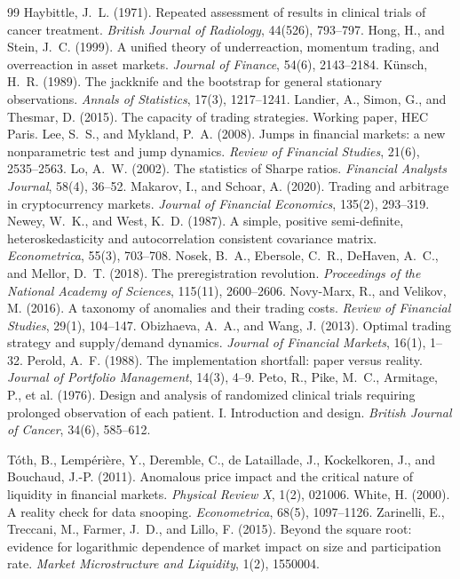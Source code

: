 \documentclass[11pt,a4paper]{article}
\begin{document}
\begin{thebibliography}{99}
 Haybittle, J.~L. (1971). Repeated assessment of results in clinical trials of cancer treatment. \emph{British Journal of Radiology}, 44(526), 793--797.
 Hong, H., and Stein, J.~C. (1999). A unified theory of underreaction, momentum trading, and overreaction in asset markets. \emph{Journal of Finance}, 54(6), 2143--2184.
 K\"unsch, H.~R. (1989). The jackknife and the bootstrap for general stationary observations. \emph{Annals of Statistics}, 17(3), 1217--1241.
 Landier, A., Simon, G., and Thesmar, D. (2015). The capacity of trading strategies. Working paper, HEC Paris.
 Lee, S.~S., and Mykland, P.~A. (2008). Jumps in financial markets: a new nonparametric test and jump dynamics. \emph{Review of Financial Studies}, 21(6), 2535--2563.
 Lo, A.~W. (2002). The statistics of Sharpe ratios. \emph{Financial Analysts Journal}, 58(4), 36--52.
 Makarov, I., and Schoar, A. (2020). Trading and arbitrage in cryptocurrency markets. \emph{Journal of Financial Economics}, 135(2), 293--319.
 Newey, W.~K., and West, K.~D. (1987). A simple, positive semi-definite, heteroskedasticity and autocorrelation consistent covariance matrix. \emph{Econometrica}, 55(3), 703--708.
 Nosek, B.~A., Ebersole, C.~R., DeHaven, A.~C., and Mellor, D.~T. (2018). The preregistration revolution. \emph{Proceedings of the National Academy of Sciences}, 115(11), 2600--2606.
 Novy-Marx, R., and Velikov, M. (2016). A taxonomy of anomalies and their trading costs. \emph{Review of Financial Studies}, 29(1), 104--147.
 Obizhaeva, A.~A., and Wang, J. (2013). Optimal trading strategy and supply/demand dynamics. \emph{Journal of Financial Markets}, 16(1), 1--32.
 Perold, A.~F. (1988). The implementation shortfall: paper versus reality. \emph{Journal of Portfolio Management}, 14(3), 4--9.
 Peto, R., Pike, M.~C., Armitage, P., et al. (1976). Design and analysis of randomized clinical trials requiring prolonged observation of each patient. I. Introduction and design. \emph{British Journal of Cancer}, 34(6), 585--612.

 T\'oth, B., Lemp\'eri\`ere, Y., Deremble, C., de Lataillade, J., Kockelkoren, J., and Bouchaud, J.-P. (2011). Anomalous price impact and the critical nature of liquidity in financial markets. \emph{Physical Review X}, 1(2), 021006.
 White, H. (2000). A reality check for data snooping. \emph{Econometrica}, 68(5), 1097--1126.
 Zarinelli, E., Treccani, M., Farmer, J.~D., and Lillo, F. (2015). Beyond the square root: evidence for logarithmic dependence of market impact on size and participation rate. \emph{Market Microstructure and Liquidity}, 1(2), 1550004.
\end{thebibliography}
\end{document}
